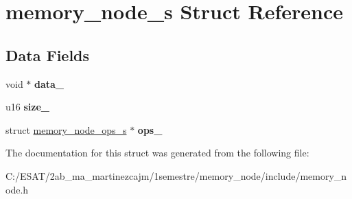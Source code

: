 \hypertarget{structmemory__node__s}{}\section{memory\+\_\+node\+\_\+s Struct Reference}
\label{structmemory__node__s}
\subsection*{Data Fields}
\begin{DoxyCompactItemize}
\item 
\mbox{\label{structmemory__node__s_a7b24176d394890c1567b43bf7d82f2d4}} 
void $\ast$ {\bfseries data\+\_\+}
\item 
\mbox{\label{structmemory__node__s_aeb03175defbd0acf26a7eee7be42061d}} 
u16 {\bfseries size\+\_\+}
\item 
\mbox{\label{structmemory__node__s_a9e0658104c2e954054e0606f3827bb93}} 
struct \hyperlink{structmemory__node__ops__s}{memory\+\_\+node\+\_\+ops\+\_\+s} $\ast$ {\bfseries ops\+\_\+}
\end{DoxyCompactItemize}


The documentation for this struct was generated from the following file\+:\begin{DoxyCompactItemize}
\item 
C\+:/\+E\+S\+A\+T/2ab\+\_\+ma\+\_\+martinezcajm/1semestre/memory\+\_\+node/include/memory\+\_\+node.\+h\end{DoxyCompactItemize}
